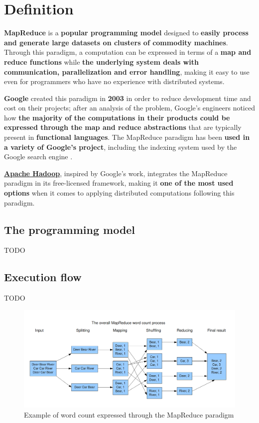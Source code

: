 \section{Definition}
\textbf{MapReduce} is a \textbf{popular programming model} designed to \textbf{easily process and generate large datasets on clusters of commodity machines}. Through this paradigm, a computation can be expressed in terms of a \textbf{map and reduce functions} while \textbf{the underlying system deals with communication, parallelization and error handling}, making it easy to use even for programmers who have no experience with distributed systems.

\textbf{Google} created this paradigm in \textbf{2003} in order to reduce development time and cost on their projects; after an analysis of the problem, Google's engineers noticed how \textbf{the majority of the computations in their products could be expressed through the map and reduce abstractions} that are typically present in \textbf{functional languages}. The MapReduce paradigm has been \textbf{used in a variety of Google's project}, including the indexing system used by the Google search engine \cite{google_mapreduce}.

\textbf{\href{https://hadoop.apache.org/}{Apache Hadoop}}, inspired by Google's work, integrates the MapReduce paradigm in its free-licensed framework, making it \textbf{one of the most used options} when it comes to applying distributed computations following this paradigm.

\subsection{The programming model}
TODO

\subsection{Execution flow}
TODO

\begin{figure}[H]
    \centering
    \includegraphics[width=\linewidth]{document/chapters/chapter_4/images/mapreduce_example.png}
    \caption{Example of word count expressed through the MapReduce paradigm \cite{mapreduce_example_site}}
    \label{fig:mapreduce_example}
\end{figure}

